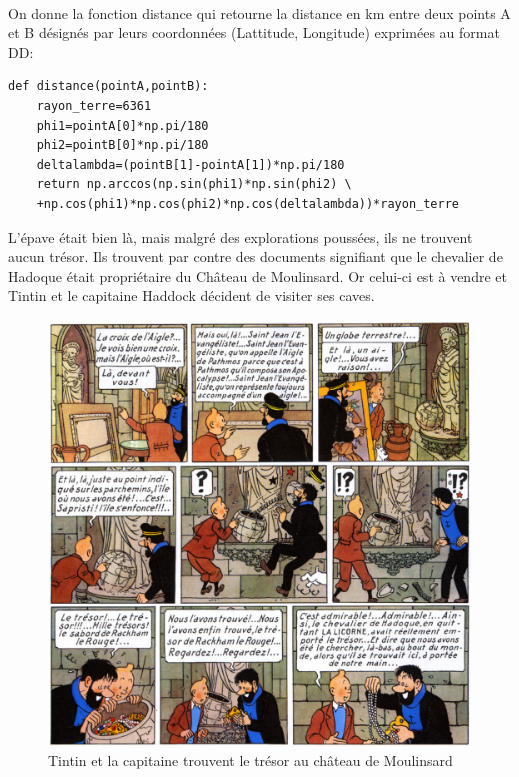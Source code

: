 
~\

On donne la fonction distance qui retourne la distance en km entre deux points A et B désignés par leurs coordonnées (Lattitude, Longitude) exprimées au format DD:

\begin{verbatim}
def distance(pointA,pointB):
    rayon_terre=6361
    phi1=pointA[0]*np.pi/180
    phi2=pointB[0]*np.pi/180
    deltalambda=(pointB[1]-pointA[1])*np.pi/180
    return np.arccos(np.sin(phi1)*np.sin(phi2) \
    +np.cos(phi1)*np.cos(phi2)*np.cos(deltalambda))*rayon_terre
\end{verbatim}


L'épave était bien là, mais malgré des explorations poussées, ils ne trouvent aucun trésor. Ils trouvent par contre des documents signifiant que le chevalier de Hadoque était propriétaire du Château de Moulinsard. Or celui-ci est à vendre et Tintin et le capitaine Haddock décident de visiter ses caves.

\begin{figure}[ht!]
\begin{center}
 \includegraphics[width=.8\textwidth]{img/decouverte_tresor}
\end{center}
\vspace{-0.8cm}
\caption{\label{fig04} Tintin et la capitaine trouvent le trésor au château de Moulinsard}
\end{figure}

